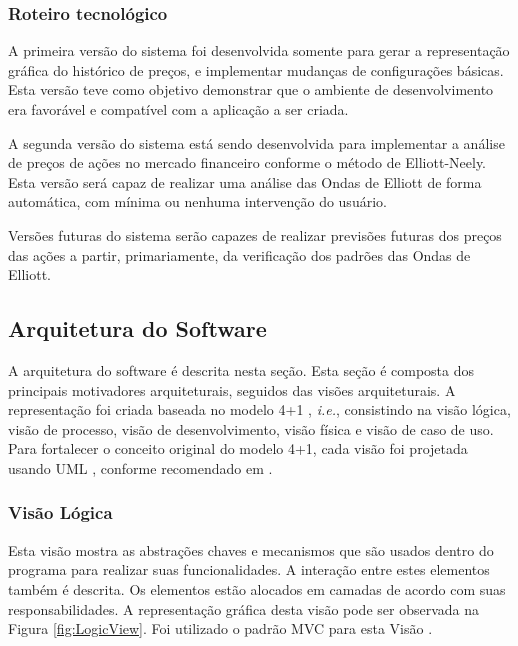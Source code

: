 \documentclass[12pt]{article}
\begin{document}
\subsubsection{Roteiro tecnológico}

A primeira versão do sistema foi desenvolvida somente para gerar a representação gráfica
do histórico de preços, e implementar mudanças de configurações básicas. Esta versão teve
como objetivo demonstrar que o ambiente de desenvolvimento era favorável e compatível
com a aplicação a ser criada.

A segunda versão do sistema está sendo desenvolvida para implementar a análise de preços
de ações no mercado financeiro conforme o método de Elliott-Neely. Esta versão será capaz
de realizar uma análise das Ondas de Elliott de forma automática, com mínima ou nenhuma
intervenção do usuário.

Versões futuras do sistema serão capazes de realizar previsões futuras dos preços das ações
a partir, primariamente, da verificação dos padrões das Ondas de Elliott.

\subsection{Arquitetura do Software}

A arquitetura do software é descrita nesta seção. Esta seção é composta dos principais
motivadores arquiteturais, seguidos das visões arquiteturais. A representação foi criada
baseada no modelo 4+1 \cite{Kruchten:1995}, \emph{i.e.}, consistindo na visão lógica,
visão de processo, visão de desenvolvimento, visão física e visão de caso de uso.
Para fortalecer o conceito original do modelo 4+1, cada visão foi projetada usando
UML \cite{UML}, conforme recomendado em \cite{FCG:2007}.

\subsubsection{Visão Lógica}

Esta visão mostra as abstrações chaves e mecanismos que são usados dentro do programa
para realizar suas funcionalidades. A interação entre estes elementos também é descrita.
Os elementos estão alocados em camadas de acordo com suas responsabilidades. A representação 
gráfica desta visão pode ser observada na Figura \ref{fig:LogicView}. Foi utilizado o
padrão MVC para esta Visão \cite{KrasnerPope:1988} \cite{Buschmann:1988}.
\end{document}
